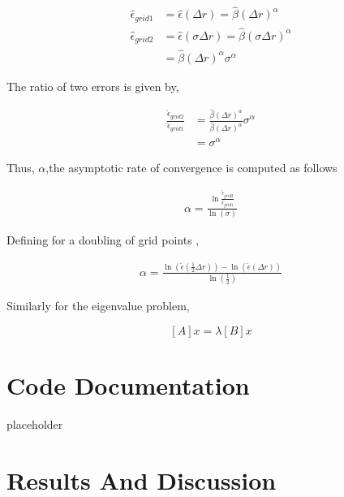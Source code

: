 \documentclass[12pt]{article}
\begin{document}
\begin{align*}
    \hat{\epsilon}_{grid 1} &= \hat{\epsilon}(\Delta r) = \hat{\beta}(\Delta r)^{\alpha} \\
    \hat{\epsilon}_{grid 2} &= \hat{\epsilon}(\sigma \Delta r) = \hat{\beta}(\sigma \Delta r)^{\alpha} \\
                            &= \hat{\beta}(\Delta r)^{\alpha} \sigma^{\alpha}
\end{align*}

The ratio of two errors is given by,

\begin{align*}
    \frac{\hat{\epsilon}_{grid 2}}{\hat{\epsilon}_{grid 1}} &= 
    \frac{\hat{\beta}(\Delta r )^{\alpha}}{\hat{\beta}(\Delta r )^{\alpha}} \sigma^{\alpha} \\ &= \sigma^{\alpha}
\end{align*}

Thus, $\alpha$,the asymptotic rate of convergence is computed as follows 

\begin{align*}
    \alpha = \frac{
        \ln \frac{
            \hat{\epsilon}_{grid 2}
    }{\hat{\epsilon}_{grid 1} }}
    {\ln\left( \sigma \right) }
\end{align*}

Defining  for a doubling of grid points ,

\begin{align*}
    \alpha = \frac{\ln \left( \hat{\epsilon}\left( \frac{1}{2}\Delta  r\right)
            \right) -\ln \left( \hat{\epsilon}\left( \Delta  r\right)
    \right)}{\ln \left( \frac{1}{2} \right)}
\end{align*}

Similarly for the eigenvalue problem, 

\[ [A]x = \lambda [B]x \]

\section{Code Documentation}

placeholder
\section{Results And Discussion}

% 

\begin{figure}
    \begin{center}
        \scalebox{0.75}{}
    \end{center}
\end{figure}
\end{document}

